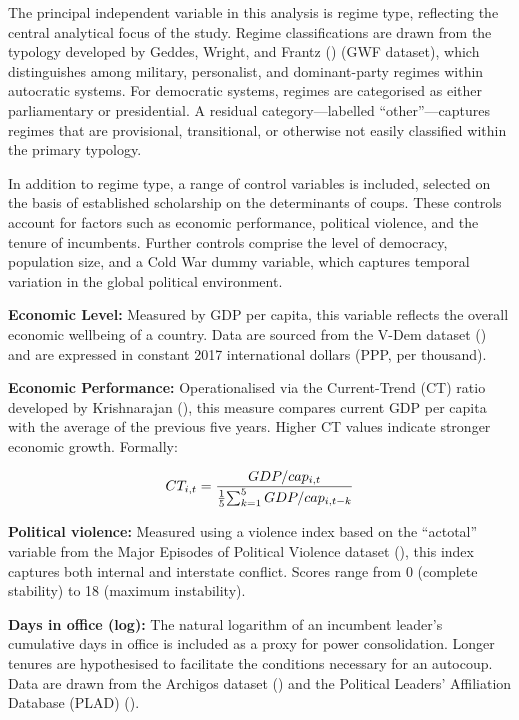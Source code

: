 \documentclass[
  12pt,
]{report}
\begin{document}
The principal independent variable in this analysis is regime type,
reflecting the central analytical focus of the study. Regime
classifications are drawn from the typology developed by Geddes, Wright,
and Frantz () (GWF dataset), which
distinguishes among military, personalist, and dominant-party regimes
within autocratic systems. For democratic systems, regimes are
categorised as either parliamentary or presidential. A residual
category---labelled ``other''---captures regimes that are provisional,
transitional, or otherwise not easily classified within the primary
typology.

In addition to regime type, a range of control variables is included,
selected on the basis of established scholarship on the determinants of
coups. These controls account for factors such as economic performance,
political violence, and the tenure of incumbents. Further controls
comprise the level of democracy, population size, and a Cold War dummy
variable, which captures temporal variation in the global political
environment.

\textbf{Economic Level:} Measured by GDP per capita, this variable
reflects the overall economic wellbeing of a country. Data are sourced
from the V-Dem dataset ()
and are expressed in constant 2017 international dollars (PPP, per
thousand).

\textbf{Economic Performance:} Operationalised via the Current-Trend
(CT) ratio developed by Krishnarajan
(), this measure compares current
GDP per capita with the average of the previous five years. Higher CT
values indicate stronger economic growth. Formally:

\[
    \begin{aligned}
    CT_{i,t} = {GDP/cap_{i,t} \over {1 \over 5} {\sum_{k=1}^5GDP/cap_{i,t-k}}}
    \end{aligned}
\]

\textbf{Political violence:} Measured using a violence index based on
the ``actotal'' variable from the Major Episodes of Political Violence
dataset (),
this index captures both internal and interstate conflict. Scores range
from 0 (complete stability) to 18 (maximum instability).

\textbf{Days in office (log):} The natural logarithm of an incumbent
leader's cumulative days in office is included as a proxy for power
consolidation. Longer tenures are hypothesised to facilitate the
conditions necessary for an autocoup. Data are drawn from the Archigos
dataset () and the Political Leaders' Affiliation Database (PLAD)
().
\end{document}
